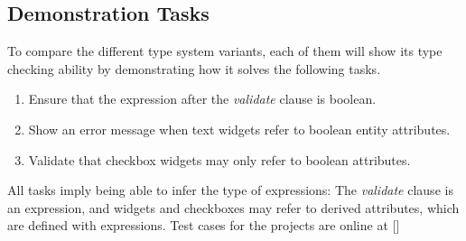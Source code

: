 %

\subsection{Demonstration Tasks}
To compare the different type system variants, each of them will show its type
checking ability by demonstrating how it solves the following tasks.
\begin{enumerate}
\item Ensure that the expression after the \emph{validate} clause is boolean.
\item Show an error message when text widgets refer to boolean entity attributes.
\item Validate that checkbox widgets may only refer to boolean attributes.
\end{enumerate}

All tasks imply being able to infer the type of expressions: The \emph{validate}
clause is an expression, and widgets and checkboxes may refer to derived
attributes, which are defined with expressions. Test cases for the projects are
online at []%
